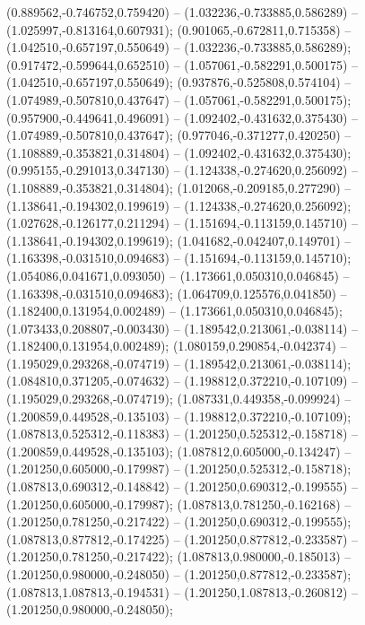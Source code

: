  (0.889562,-0.746752,0.759420) -- (1.032236,-0.733885,0.586289) -- (1.025997,-0.813164,0.607931);
 (0.901065,-0.672811,0.715358) -- (1.042510,-0.657197,0.550649) -- (1.032236,-0.733885,0.586289);
 (0.917472,-0.599644,0.652510) -- (1.057061,-0.582291,0.500175) -- (1.042510,-0.657197,0.550649);
 (0.937876,-0.525808,0.574104) -- (1.074989,-0.507810,0.437647) -- (1.057061,-0.582291,0.500175);
 (0.957900,-0.449641,0.496091) -- (1.092402,-0.431632,0.375430) -- (1.074989,-0.507810,0.437647);
 (0.977046,-0.371277,0.420250) -- (1.108889,-0.353821,0.314804) -- (1.092402,-0.431632,0.375430);
 (0.995155,-0.291013,0.347130) -- (1.124338,-0.274620,0.256092) -- (1.108889,-0.353821,0.314804);
 (1.012068,-0.209185,0.277290) -- (1.138641,-0.194302,0.199619) -- (1.124338,-0.274620,0.256092);
 (1.027628,-0.126177,0.211294) -- (1.151694,-0.113159,0.145710) -- (1.138641,-0.194302,0.199619);
 (1.041682,-0.042407,0.149701) -- (1.163398,-0.031510,0.094683) -- (1.151694,-0.113159,0.145710);
 (1.054086,0.041671,0.093050) -- (1.173661,0.050310,0.046845) -- (1.163398,-0.031510,0.094683);
 (1.064709,0.125576,0.041850) -- (1.182400,0.131954,0.002489) -- (1.173661,0.050310,0.046845);
 (1.073433,0.208807,-0.003430) -- (1.189542,0.213061,-0.038114) -- (1.182400,0.131954,0.002489);
 (1.080159,0.290854,-0.042374) -- (1.195029,0.293268,-0.074719) -- (1.189542,0.213061,-0.038114);
 (1.084810,0.371205,-0.074632) -- (1.198812,0.372210,-0.107109) -- (1.195029,0.293268,-0.074719);
 (1.087331,0.449358,-0.099924) -- (1.200859,0.449528,-0.135103) -- (1.198812,0.372210,-0.107109);
 (1.087813,0.525312,-0.118383) -- (1.201250,0.525312,-0.158718) -- (1.200859,0.449528,-0.135103);
 (1.087812,0.605000,-0.134247) -- (1.201250,0.605000,-0.179987) -- (1.201250,0.525312,-0.158718);
 (1.087813,0.690312,-0.148842) -- (1.201250,0.690312,-0.199555) -- (1.201250,0.605000,-0.179987);
 (1.087813,0.781250,-0.162168) -- (1.201250,0.781250,-0.217422) -- (1.201250,0.690312,-0.199555);
 (1.087813,0.877812,-0.174225) -- (1.201250,0.877812,-0.233587) -- (1.201250,0.781250,-0.217422);
 (1.087813,0.980000,-0.185013) -- (1.201250,0.980000,-0.248050) -- (1.201250,0.877812,-0.233587);
 (1.087813,1.087813,-0.194531) -- (1.201250,1.087813,-0.260812) -- (1.201250,0.980000,-0.248050);
